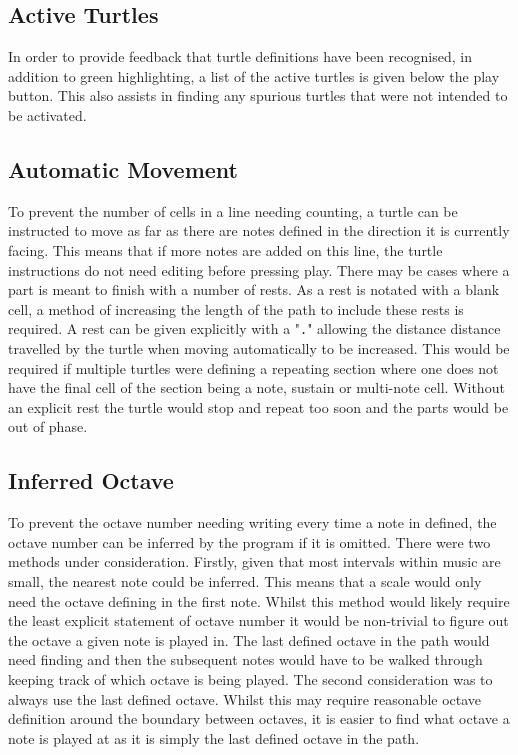 \subsection{Active Turtles}

In order to provide feedback that turtle definitions have been recognised, in addition to green highlighting, a list of the active turtles is given below the play button. This also assists in finding any spurious turtles that were not intended to be activated.

\subsection{Automatic Movement}

To prevent the number of cells in a line needing counting, a turtle can be instructed to move as far as there are notes defined in the direction it is currently facing. This means that if more notes are added on this line, the turtle instructions do not need editing before pressing play. There may be cases where a part is meant to finish with a number of rests. As a rest is notated with a blank cell, a method of increasing the length of the path to include these rests is required. A rest can be given explicitly with a "\texttt{.}" allowing the distance distance travelled by the turtle when moving automatically to be increased. This would be required if multiple turtles were defining a repeating section where one does not have the final cell of the section being a note, sustain or multi-note cell. Without an explicit rest the turtle would stop and repeat too soon and the parts would be out of phase.

\subsection{Inferred Octave}

To prevent the octave number needing writing every time a note in defined, the octave number can be inferred by the program if it is omitted. There were two methods under consideration. Firstly, given that most intervals within music are small, the nearest note could be inferred. This means that a scale would only need the octave defining in the first note. Whilst this method would likely require the least explicit statement of octave number it would be non-trivial to figure out the octave a given note is played in. The last defined octave in the path would need finding and then the subsequent notes would have to be walked through keeping track of which octave is being played. The second consideration was to always use the last defined octave. Whilst this may require reasonable octave definition around the boundary between octaves, it is easier to find what octave a note is played at as it is simply the last defined octave in the path.

